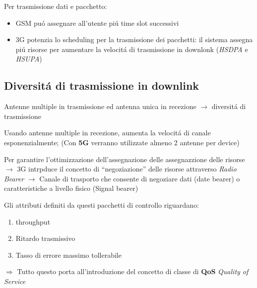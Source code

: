 \documentclass{article}
\begin{document}
Per trasmissione dati e pacchetto:
\begin{itemize}
    \item GSM pu\'o assegnare all'utente pi\'u time slot successivi
    \item 3G potenzia lo scheduling per la trasmissione dei pacchetti: il sistema assegna pi\'u risorse per aumentare la velocit\'a di trasmissione in downlonk (\textit{HSDPA} e \textit{HSUPA})
\end{itemize}


\subsection{Diversit\'a di trasmissione in downlink}

Antenne multiple in trasmissione ed antenna unica in recezione $\rightarrow$ diversit\'a di trasmissione

Usando antenne multiple in recezione, aumenta la velocit\'a di canale esponenzialmente; (Con \textbf{5G} verranno utilizzate almeno 2 antenne per device)


Per garantire l'ottimizzazione dell'assegnazione delle assegnazzione delle risorse $\rightarrow$ 3G intrpduce il concetto di ``negoziazione'' delle risorse attraverso \textit{Radio Bearer} $\rightarrow$ Canale di trasporto che consente  di negoziare dati (date bearer) o caratteristiche a livello fisico (Signal bearer)

Gli attributi definiti da questi pacchetti di controllo riguardano:

\begin{enumerate}
    \item throughput
    \item Ritardo trasmissivo
    \item Tasso di errore massimo tollerabile
\end{enumerate}

$\Rightarrow$ Tutto questo porta all'introduzione del concetto di classe  di \textbf{QoS} \textit{Quality of Service}
\end{document}
